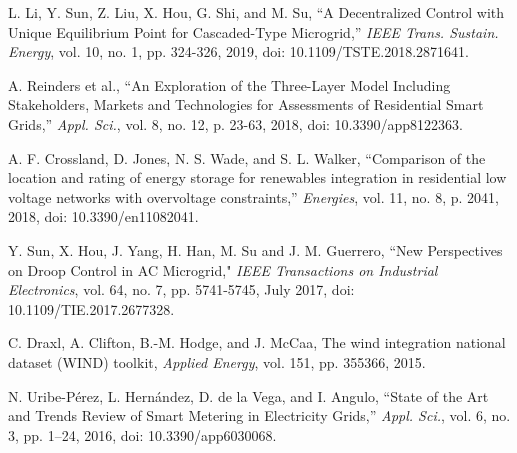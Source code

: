 
\begin{thebibliography}{00}



 L. Li, Y. Sun, Z. Liu, X. Hou, G. Shi, and M. Su, ``A Decentralized Control with Unique Equilibrium Point for Cascaded-Type Microgrid,” \emph{IEEE Trans. Sustain. Energy}, vol. 10, no. 1, pp. 324-326, 2019, doi: 10.1109/TSTE.2018.2871641.

 A. Reinders et al., ``An Exploration of the Three-Layer Model Including Stakeholders, Markets and Technologies for Assessments of Residential Smart Grids,” \emph{Appl. Sci.}, vol. 8, no. 12, p. 23-63, 2018, doi: 10.3390/app8122363.

 A. F. Crossland, D. Jones, N. S. Wade, and S. L. Walker, ``Comparison of the location and rating of energy storage for renewables integration in residential low voltage networks with overvoltage constraints,” \emph{Energies}, vol. 11, no. 8, p. 2041, 2018, doi: 10.3390/en11082041.

 Y. Sun, X. Hou, J. Yang, H. Han, M. Su and J. M. Guerrero, ``New Perspectives on Droop Control in AC Microgrid," \emph{IEEE Transactions on Industrial Electronics}, vol. 64, no. 7, pp. 5741-5745, July 2017, doi: 10.1109/TIE.2017.2677328.


 C. Draxl, A. Clifton, B.-M. Hodge, and J. McCaa, The wind integration national dataset (WIND) toolkit, \emph{Applied Energy}, vol. 151, pp. 355366, 2015.

N. Uribe-Pérez, L. Hernández, D. de la Vega, and I. Angulo, ``State of the Art and Trends Review of Smart Metering in Electricity Grids,” \emph{Appl. Sci.}, vol. 6, no. 3, pp. 1–24, 2016, doi: 10.3390/app6030068.





\end{thebibliography}
